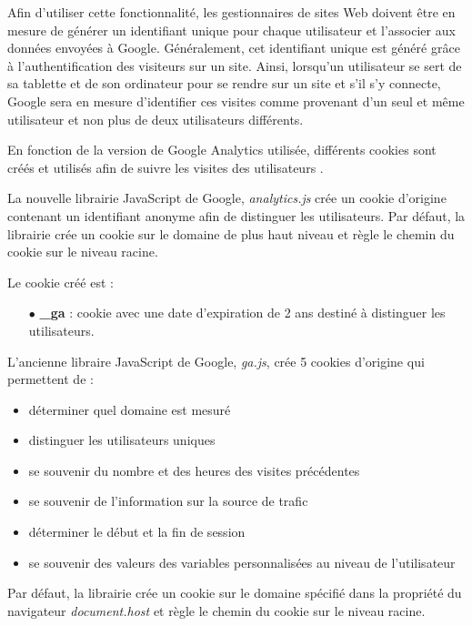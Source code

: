 Afin d'utiliser cette fonctionnalité, les gestionnaires de sites Web doivent être en mesure de générer un identifiant unique pour chaque utilisateur et l'associer aux données envoyées à Google. Généralement, cet identifiant unique est généré grâce à l'authentification des visiteurs sur un site. Ainsi, lorsqu'un utilisateur se sert de sa tablette et de son ordinateur pour se rendre sur un site et s'il s'y connecte, Google sera en mesure d'identifier ces visites comme provenant d'un seul et même utilisateur et non plus de deux utilisateurs différents.
\newline

En fonction de la version de Google Analytics utilisée, différents cookies sont créés et utilisés afin de suivre les visites des utilisateurs \cite{Google_Analytics_cookies}.
\newline

La nouvelle librairie JavaScript de Google, \textit{analytics.js} crée un cookie d'origine contenant un identifiant anonyme afin de distinguer les utilisateurs. Par défaut, la librairie crée un cookie sur le domaine de plus haut niveau et règle le chemin du cookie sur le niveau racine.

Le cookie créé est :
\begin{itemize}
  \item[$\bullet$] \textbf{\_ga} : cookie avec une date d'expiration de 2 ans destiné à distinguer les utilisateurs.
  \newline
\end{itemize}

L'ancienne libraire JavaScript de Google, \textit{ga.js}, crée 5 cookies d'origine qui permettent de :
\begin{itemize}
  \item déterminer quel domaine est mesuré
  \item distinguer les utilisateurs uniques
  \item se souvenir du nombre et des heures des visites précédentes
  \item se souvenir de l'information sur la source de trafic
  \item déterminer le début et la fin de session
  \item se souvenir des valeurs des variables personnalisées au niveau de l'utilisateur
\end{itemize}

Par défaut, la librairie crée un cookie sur le domaine spécifié dans la propriété du navigateur \textit{document.host} et règle le chemin du cookie sur le niveau racine.

